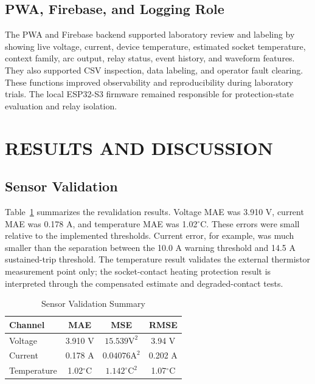 \documentclass[conference,a4paper]{template/IEEEtran}
\begin{document}
\FloatBarrier
\subsection{PWA, Firebase, and Logging Role}

The PWA and Firebase backend supported laboratory review and labeling by showing
live voltage, current, device temperature, estimated socket temperature,
context family, arc output, relay status, event history, and waveform
features. They also supported CSV inspection, data labeling, and operator
fault clearing. These functions improved observability and reproducibility
during laboratory trials. The local ESP32-S3 firmware remained responsible for protection-state
evaluation and relay isolation.

\FloatBarrier
\section{RESULTS AND DISCUSSION}

\subsection{Sensor Validation}

Table~\ref{tab:sensor-validation} summarizes the revalidation results.
Voltage MAE was 3.910 V, current MAE was 0.178 A, and temperature MAE was
1.02$^{\circ}$C. These errors were small relative to the implemented
thresholds. Current error, for example, was much smaller than the
separation between the 10.0 A warning threshold and 14.5 A sustained-trip
threshold. The temperature result validates the external thermistor
measurement point only; the socket-contact heating protection result is
interpreted through the compensated estimate and degraded-contact
tests.

\begin{table}[!htbp]
\caption{Sensor Validation Summary}
\label{tab:sensor-validation}
\centering
\small
\setlength{\tabcolsep}{4pt}
\begin{tabular*}{\columnwidth}{@{\extracolsep{\fill}}lccc@{}}
\toprule
\textbf{Channel} & \textbf{MAE} & \textbf{MSE} & \textbf{RMSE}\\
\midrule
Voltage & 3.910 V & $15.539\mathrm{V}^2$ & 3.94 V\\
Current & 0.178 A & $0.04076\mathrm{A}^2$ & 0.202 A\\
Temperature & 1.02$^{\circ}$C & $1.142^{\circ}\mathrm{C}^2$ & 1.07$^{\circ}$C\\
\bottomrule
\end{tabular*}
\end{table}
\end{document}
